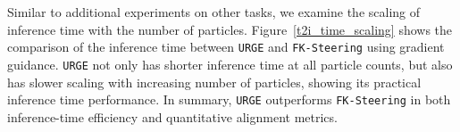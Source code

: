 \documentclass{article}
\theoremstyle{plain}
\theoremstyle{definition}
\theoremstyle{remark}
\begin{document}
Similar to additional experiments on other tasks, we examine the scaling of inference time with the number of particles. Figure~\ref{t2i_time_scaling} shows the comparison of the inference time between \texttt{URGE} and \texttt{FK-Steering} using gradient guidance. \texttt{URGE} not only has shorter inference time at all particle counts, but also has slower scaling with increasing number of particles, showing its practical inference time performance. In summary, \texttt{URGE} outperforms \texttt{FK-Steering} in both inference-time efficiency and quantitative alignment metrics.
\end{document}
